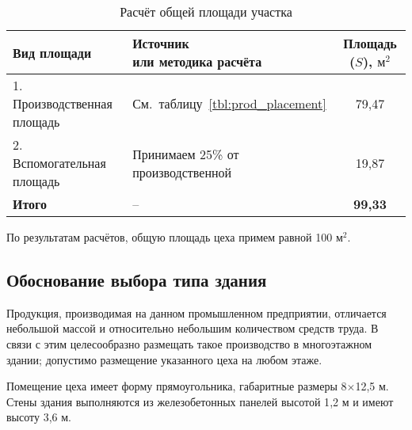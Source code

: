 \begin{table} [h!]
  \caption{
    Расчёт общей площади участка
  }\label{tbl:common_placement}
    \begin{tabular}{| m{5.8cm} | m{5.75cm} | c |}
      \hline
      \parbox{5.8cm}{
        \smallskip
        \centering Вид  площади
        \smallskip
      }
      & \parbox{5.75cm}{
          \smallskip
          \centering Источник \\ или методика расчёта
          \smallskip
      }
      & Площадь (\( S \)), \( \text{м}^2 \) \\
      \hline

      1. Производственная \newline площадь
      & \centering См.~таблицу~\ref{tbl:prod_placement}
      & 79,47 \\
      \hline

      2. Вспомогательная \newline площадь
      & \centering Принимаем 25\% \newline от производственной
      & 19,87 \\
      \hline


      \textbf{Итого} & \centering -- & \textbf{99,33} \\
      \hline
    \end{tabular}
\end{table}

\newpage

По результатам расчётов, общую площадь цеха примем равной
100 \( \text{м}^2 \).

\subsection{Обоснование выбора типа здания}

Продукция, производимая на данном промышленном предприятии,
отличается небольшой массой и относительно небольшим количеством средств труда.
 В связи с этим целесообразно размещать такое производство в многоэтажном здании;
допустимо размещение указанного цеха на любом этаже.

Помещение цеха имеет форму прямоугольника, габаритные размеры 8$\times$12,5 м.
Стены здания выполняются из железобетонных панелей высотой 1{,}2 м и
имеют высоту 3{,}6 м.
